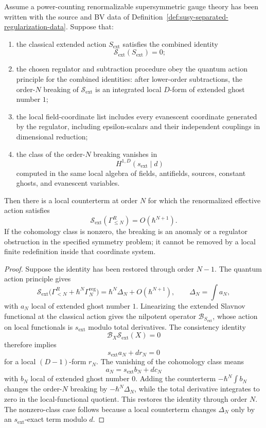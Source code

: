 \begin{proposition}
\label{prop:susy-ward-restoration}
Assume a power-counting renormalizable supersymmetric gauge theory has been
written with the source and BV data of
Definition~\ref{def:susy-separated-regularization-data}.  Suppose that:
\begin{enumerate}
\item the classical extended action \(S_{\mathrm{ext}}\) satisfies the
combined identity
\[
  \mathcal S_{\mathrm{ext}}(S_{\mathrm{ext}})=0;
\]
\item the chosen regulator and subtraction procedure obey the quantum action
principle for the combined identities: after lower-order subtractions, the
order-\(N\) breaking of \(\mathcal S_{\mathrm{ext}}\) is an integrated local
\(D\)-form of extended ghost number \(1\);
\item the local field-coordinate list includes every evanescent coordinate
generated by the regulator, including epsilon-scalars and their independent
couplings in dimensional reduction;
\item the class of the order-\(N\) breaking vanishes in
\[
  H^{1,D}(s_{\mathrm{ext}}\mid d)
\]
computed in the same local algebra of fields, antifields, sources, constant
ghosts, and evanescent variables.
\end{enumerate}
Then there is a local counterterm at order \(N\) for which the renormalized
effective action satisfies
\[
  \mathcal S_{\mathrm{ext}}(\Gamma^R_{\le N})
  =
  O(\hbar^{N+1}).
\]
If the cohomology class is nonzero, the breaking is an anomaly or a regulator
obstruction in the specified symmetry problem; it cannot be removed by a local
finite redefinition inside that coordinate system.
\end{proposition}

\begin{proof}
Suppose the identity has been restored through order \(N-1\).  The quantum
action principle gives
\[
  \mathcal S_{\mathrm{ext}}
  \bigl(\Gamma^R_{<N}+\hbar^N\Gamma_N^{\mathrm{reg}}\bigr)
  =
  \hbar^N\Delta_N+O(\hbar^{N+1}),
  \qquad
  \Delta_N=\int a_N ,
\]
with \(a_N\) local of extended ghost number \(1\).  Linearizing the extended
Slavnov functional at the classical action gives the nilpotent operator
\(\mathcal B_{S_{\mathrm{ext}}}\), whose action on local functionals is
\(s_{\mathrm{ext}}\) modulo total derivatives.  The consistency identity
\[
  \mathcal B_X\mathcal S_{\mathrm{ext}}(X)=0
\]
therefore implies
\[
  s_{\mathrm{ext}}a_N+d r_N=0
\]
for a local \((D-1)\)-form \(r_N\).  The vanishing of the cohomology class
means
\[
  a_N=s_{\mathrm{ext}}b_N+d c_N
\]
with \(b_N\) local of extended ghost number \(0\).  Adding the counterterm
\(-\hbar^N\int b_N\) changes the order-\(N\) breaking by
\(-\hbar^N\Delta_N\), while the total derivative integrates to zero in the
local-functional quotient.  This restores the identity through order \(N\).
The nonzero-class case follows because a local counterterm changes
\(\Delta_N\) only by an \(s_{\mathrm{ext}}\)-exact term modulo \(d\).
\end{proof}

